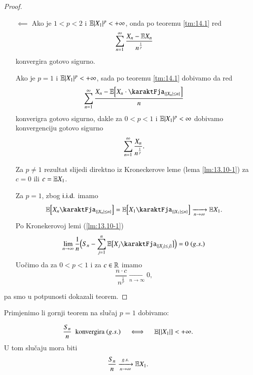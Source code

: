 \begin{proof}
\begin{enumerate}
    \item[$\impliedby$]
        Ako je $1 < p <2$ i $\mathbb{E} |X_1|^p < +\infty$, onda po teoremu \ref{tm:14.1} red
        \begin{equation*}
            \sum\limits_{n = 1}^{\infty} \frac{X_n - \mathbb{E} X_n}{n^\frac{1}{p}}
        \end{equation*}
        konvergira gotovo sigurno.

        Ako je $p = 1$ i $\mathbb{E} |X_1|^p < +\infty$, sada po teoremu \ref{tm:14.1} dobivamo da red
        \begin{equation*}
            \suma{n = 1}{\infty} \frac{X_n - \masE \Big[ X_n \cdot \karaktFja_{\{ |X_n| \leq n \}} \Big]}{n}
        \end{equation*}
        konverigra gotovo sigurno, dakle za $0 < p <1$ i $\mathbb{E} |X_1|^p < \infty$ dobivamo konvergenciju gotovo sigurno
        \begin{equation*}
            \sum\limits_{n = 1}^{\infty} \frac{X_n}{n^\frac{1}{p}}.
        \end{equation*}
        
        Za $p \neq 1$ rezultat slijedi direktno iz Kroneckerove leme (lema \ref{lm:13.10-1}) za $c = 0$ ili $c = \mathbb{E} X_1$.

        Za $p = 1$, zbog $\mathrm{i.i.d.}$ imamo
        \begin{equation*}
            \masE \Big[ X_n \karaktFja_{\{ |X_n| \leq n \}} \Big] = \masE \Big[ X_1 \karaktFja_{\{ |X_1| \leq n \}} \Big] \xrightarrow[n \to \infty]{} \masE X_1. 
        \end{equation*}
        Po Kronekerovoj lemi (\ref{lm:13.10-1})
        \begin{equation*}
            \lim\limits_{n \to \infty} \frac{1}{n} \Big( S_n - \suma{j = 1}{n} \masE \big[ X_j \karaktFja_{\{ |X_j| \leq j \}} \big] \Big) = 0 \; (g.s.)
        \end{equation*}
        Uo\v cimo da za $0 < p < 1$ i za $c \in \mathbb{R}$ imamo
        \begin{equation*}
            \frac{n \cdot c}{n^\frac{1}{p}} \xrightarrow[n \to \infty]{} 0,
        \end{equation*}
    \end{enumerate}
    pa smo u potpunosti dokazali teorem.
\end{proof}

Primjenimo li gornji teorem na slu\v caj $p = 1$ dobivamo:

\begin{kor} \label{kor:14.3}
    \begin{equation*}
        \frac{S_n}{n} \; \textnormal{ konvergira } (g.s.) \quad \iff \quad \mathbb{E} [|X_1|] < + \infty.
    \end{equation*}
    U tom slu\v caju mora biti
    \begin{equation*}
        \frac{S_n}{n} \xrightarrow[n \to \infty]{g.s.} \mathbb{E} X_1.
    \end{equation*}
\end{kor}

